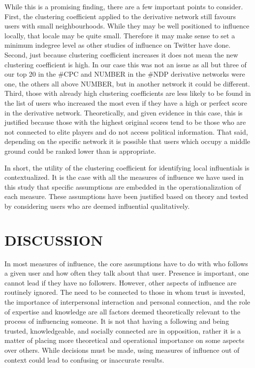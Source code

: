\documentclass[a4paper,12pt]{article}
\begin{document}
While this is a promising finding, there are a few important points to consider. First, the clustering coefficient applied to the derivative network still favours users with small neighbourhoods. While they may be well positioned to influence locally, that locale may be quite small. Therefore it may make sense to set a minimum indegree level as other studies of influence on Twitter have done. Second, just because clustering coefficient increases it does not mean the new clustering coefficient is high. In our case this was not an issue as all but three of our top 20 in the \#CPC and NUMBER in the \#NDP derivative networks were one, the others all above NUMBER, but in another network it could be different. Third, those with already high clustering coefficients are less likely to be found in the list of users who increased the most even if they have a high or perfect score in the derivative network. Theoretically, and given evidence in this case, this is justified because those with the highest original scores tend to be those who are not connected to elite players and do not access political information. That said, depending on the specific network it is possible that users which occupy a middle ground could be ranked lower than is appropriate.

In short, the utility of the clustering coefficient for identifying local influentials is contextualized. It is the case with all the measures of influence we have used in this study that specific assumptions are embedded in the operationalization of each measure. These assumptions have been justified based on theory and tested by considering users who are deemed influential qualitatively.

\section{DISCUSSION}

In most measures of influence, the core assumptions have to do with who follows a given user and how often they talk about that user. Presence is important, one cannot lead if they have no followers. However, other aspects of influence are routinely ignored. The need to be connected to those in whom trust is invested, the importance of interpersonal interaction and personal connection, and the role of expertise and knowledge are all factors deemed theoretically relevant to the process of influencing someone. It is not that having a following and being trusted, knowledgeable, and socially connected are in opposition, rather it is a matter of placing more theoretical and operational importance on some aspects over others. While decisions must be made, using measures of influence out of context could lead to confusing or inaccurate results.
\end{document}
